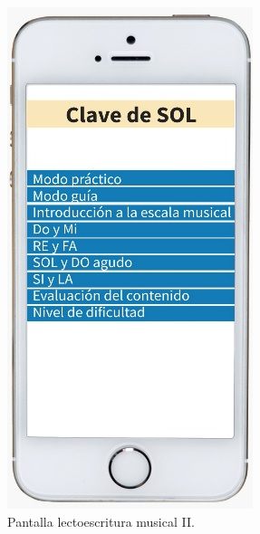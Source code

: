 \documentclass[spanish]{textolivre}
\begin{document}
\vspace{0.25cm}

\noindent
\begin{minipage}[b]{0.30\textwidth}
    \begin{figure}[H]
        \centering
        \includegraphics[width=\linewidth]{Fig3.png}
        \caption{ Pantalla lectoescritura musical II.}
    \end{figure}
\end{minipage}
\end{document}
